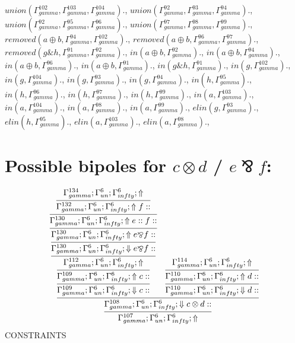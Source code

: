\documentclass[a4paper, 11pt]{article}
\begin{document}
$union(\Gamma_{gamma}^{102}, \Gamma_{gamma}^{103}, \Gamma_{gamma}^{104}).$, $union(\Gamma_{gamma}^{92}, \Gamma_{gamma}^{93}, \Gamma_{gamma}^{94}).$, $union(\Gamma_{gamma}^{92}, \Gamma_{gamma}^{95}, \Gamma_{gamma}^{96}).$, $union(\Gamma_{gamma}^{97}, \Gamma_{gamma}^{98}, \Gamma_{gamma}^{99}).$, $removed(a \oplus b, \Gamma_{gamma}^{94}, \Gamma_{gamma}^{102}).$, $removed(a \oplus b, \Gamma_{gamma}^{96}, \Gamma_{gamma}^{97}).$, $removed(g \binampersand h, \Gamma_{gamma}^{91}, \Gamma_{gamma}^{92}).$, $in(a \oplus b, \Gamma_{gamma}^{92}).$, $in(a \oplus b, \Gamma_{gamma}^{94}).$, $in(a \oplus b, \Gamma_{gamma}^{96}).$, $in(a \oplus b, \Gamma_{gamma}^{91}).$, $in(g \binampersand h, \Gamma_{gamma}^{91}).$, $in(g, \Gamma_{gamma}^{102}).$, $in(g, \Gamma_{gamma}^{104}).$, $in(g, \Gamma_{gamma}^{93}).$, $in(g, \Gamma_{gamma}^{94}).$, $in(h, \Gamma_{gamma}^{95}).$, $in(h, \Gamma_{gamma}^{96}).$, $in(h, \Gamma_{gamma}^{97}).$, $in(h, \Gamma_{gamma}^{99}).$, $in(a, \Gamma_{gamma}^{103}).$, $in(a, \Gamma_{gamma}^{104}).$, $in(a, \Gamma_{gamma}^{98}).$, $in(a, \Gamma_{gamma}^{99}).$, $elin(g, \Gamma_{gamma}^{93}).$, $elin(h, \Gamma_{gamma}^{95}).$, $elin(a, \Gamma_{gamma}^{103}).$, $elin(a, \Gamma_{gamma}^{98}).$,


\section{Possible bipoles for $c \otimes d$ / $e \bindnasrepma f$:} 

{\small
\[
\infer{\Gamma_{ gamma}^{107} ; \Gamma_{un}^{6} ; \Gamma_{ infty}^{6} ;  \Uparrow }
{\infer{\Gamma_{ gamma}^{108} ; \Gamma_{un}^{6} ; \Gamma_{ infty}^{6} ;  \Downarrow c \otimes d :: }
{\infer{\Gamma_{ gamma}^{109} ; \Gamma_{un}^{6} ; \Gamma_{ infty}^{6} ;  \Downarrow c :: }
{\infer{\Gamma_{ gamma}^{109} ; \Gamma_{un}^{6} ; \Gamma_{ infty}^{6} ;  \Uparrow c :: }
{\infer{\Gamma_{ gamma}^{112} ; \Gamma_{un}^{6} ; \Gamma_{ infty}^{6} ;  \Uparrow }
{\infer{\Gamma_{ gamma}^{130} ; \Gamma_{un}^{6} ; \Gamma_{ infty}^{6} ;  \Downarrow e \bindnasrepma f :: }
{\infer{\Gamma_{ gamma}^{130} ; \Gamma_{un}^{6} ; \Gamma_{ infty}^{6} ;  \Uparrow e \bindnasrepma f :: }
{\infer{\Gamma_{ gamma}^{130} ; \Gamma_{un}^{6} ; \Gamma_{ infty}^{6} ;  \Uparrow e :: f :: }
{\infer{\Gamma_{ gamma}^{132} ; \Gamma_{un}^{6} ; \Gamma_{ infty}^{6} ;  \Uparrow f :: }
{\Gamma_{ gamma}^{134} ; \Gamma_{un}^{6} ; \Gamma_{ infty}^{6} ;  \Uparrow }}}}}}}
&
\infer{\Gamma_{ gamma}^{110} ; \Gamma_{un}^{6} ; \Gamma_{ infty}^{6} ;  \Downarrow d :: }
{\infer{\Gamma_{ gamma}^{110} ; \Gamma_{un}^{6} ; \Gamma_{ infty}^{6} ;  \Uparrow d :: }
{\Gamma_{ gamma}^{114} ; \Gamma_{un}^{6} ; \Gamma_{ infty}^{6} ;  \Uparrow }}}}
\]
}
CONSTRAINTS
\end{document}
